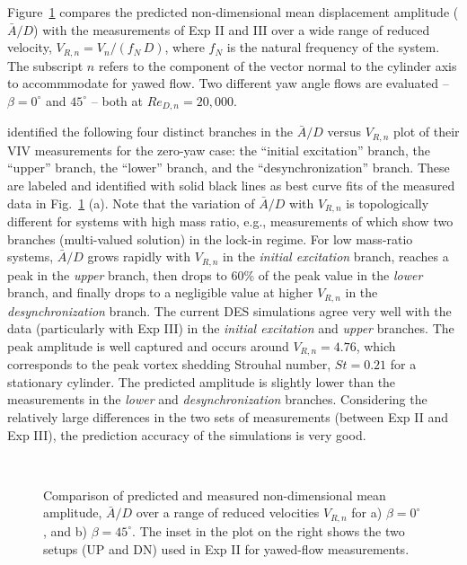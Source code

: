Figure~\ref{fig:VIV_amp} compares the predicted non-dimensional mean
displacement amplitude ($\bar{A}/D$) with the measurements of Exp II and III
over a wide range of reduced velocity, $V_{R,n} = V_n/(f_N\,D)$, where $f_N$ is
the natural frequency of the system. The subscript $n$ refers to the component
of the vector normal to the cylinder axis to accommmodate for yawed flow. Two
different yaw angle flows are evaluated -- $\beta=0^\circ$ and $45^\circ$ --
both at $Re_{D,n}=20,000$.

\citet{khalak1997fluid} identified the following four distinct branches in the
$\bar{A}/D$ versus $V_{R,n}$ plot of their VIV measurements for the zero-yaw
case: the ``initial excitation'' branch, the ``upper'' branch, the ``lower''
branch, and the ``desynchronization'' branch. These are labeled and identified
with solid black lines as best curve fits of the measured data in
Fig.~\ref{fig:VIV_amp} (a). Note that the variation of $\bar{A}/D$ with
$V_{R,n}$ is topologically different for systems with high mass ratio, e.g.,
measurements of \citet{feng1968measurement} which show two branches
(multi-valued solution) in the lock-in regime.  For low mass-ratio systems,
$\bar{A}/D$ grows rapidly with $V_{R,n}$ in the {\em initial excitation}
branch, reaches a peak in the {\em upper} branch, then drops to 60\% of the
peak value in the {\em lower} branch, and finally drops to a negligible value
at higher $V_{R,n}$ in the {\em desynchronization} branch. The current DES
simulations agree very well with the data (particularly with Exp III) in the
{\em initial excitation} and {\em upper} branches. The peak amplitude is well
captured and occurs around $V_{R,n}=4.76$, which corresponds to the peak vortex
shedding Strouhal number, $St=0.21$ for a stationary cylinder. The predicted
amplitude is slightly lower than the measurements in the {\em lower} and {\em
desynchronization} branches. Considering the relatively large differences in
the two sets of measurements (between Exp II and Exp III), the prediction
accuracy of the simulations is very good.
%
\begin{figure}[htb!]
  \centering
   {}
  \qquad
   \\
    \caption{Comparison of predicted and measured non-dimensional mean
      amplitude, $\bar{A}/D$ over a range of reduced velocities $V_{R,n}$ for
      a) $\beta=0^\circ$, and b) $\beta=45^\circ$. The inset in the plot on the
      right shows the two setups (UP and DN) used in Exp II for yawed-flow
      measurements.} 
  \label{fig:VIV_amp}
\end{figure}

